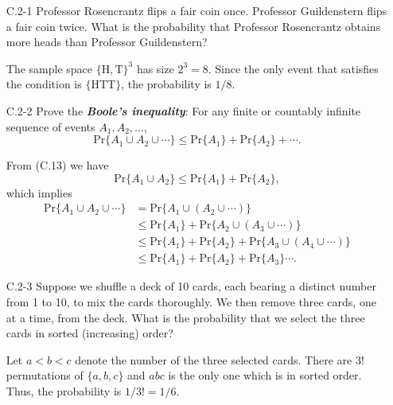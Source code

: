 \documentclass{report}
\makeatletter
\renewenvironment{framed}{%
 \def\FrameCommand##1{\hskip\@totalleftmargin
 \fboxsep=\FrameSep\fbox{##1}}%
 \MakeFramed {\advance\hsize-\width
   \@totalleftmargin\z@ \linewidth\hsize
   \@setminipage}}%
 {\par\unskip\endMakeFramed}
\makeatother
\begin{document}
\begin{enumerate}

\item[C.2{-}1] {Professor Rosencrantz flips a fair coin once. Professor
Guildenstern flips a fair coin twice. What is the probability that Professor
Rosencrantz obtains more heads than Professor Guildenstern?}

\begin{framed}
The sample space $\{\text{H}, \text{T}\}^3$ has size $2^3 = 8$. Since the only
event that satisfies the condition is $\{\text{HTT}\}$, the probability is $1/8$.
\end{framed}

\item[C.2{-}2] {Prove the \textbf{\emph{Boole's inequality}}: For any finite or
countably infinite sequence of events $A_1, A_2, \dots$,
\[
  \text{Pr}\{A_1 \cup A_2 \cup \cdots\} \le \text{Pr}\{A_1\} + \text{Pr}\{A_2\} + \cdots.
\]
}

\begin{framed}
From (C.13) we have
\[
\text{Pr}\{A_1 \cup A_2\} \le \text{Pr}\{A_1\} + \text{Pr}\{A_2\},
\]
which implies
\begin{equation*}
\begin{aligned}
  \text{Pr}\{A_1 \cup A_2 \cup \cdots\} &=   \text{Pr}\{A_1 \cup (A_2 \cup \cdots)\}\\
                                        &\le \text{Pr}\{A_1\} + \text{Pr}\{A_2 \cup (A_3 \cup \cdots)\}\\
                                        &\le \text{Pr}\{A_1\} + \text{Pr}\{A_2\} + \text{Pr}\{A_3 \cup (A_4 \cup \cdots)\}\\
                                        &\le \text{Pr}\{A_1\} + \text{Pr}\{A_2\} + \text{Pr}\{A_3\} \cdots.
\end{aligned}
\end{equation*}
\end{framed}

\item[C.2{-}3] {Suppose we shuffle a deck of 10 cards, each bearing a distinct
number from 1 to 10, to mix the cards thoroughly. We then remove three cards,
one at a time, from the deck. What is the probability that we select the three
cards in sorted (increasing) order?}

\begin{framed}
Let $a < b < c$ denote the number of the three selected cards. There are $3!$
permutations of $\{a, b, c\}$ and $abc$ is the only one which is in sorted
order. Thus, the probability is $1/3! = 1/6$.
\end{framed}


\end{enumerate}
\end{document}
